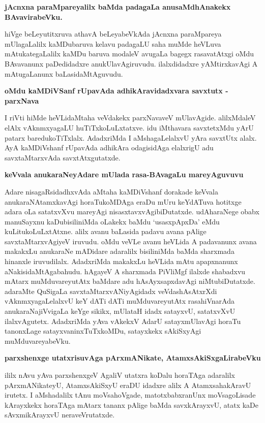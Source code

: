 {\bigskip
\noindent
{\large\bf jAcnxna paraMpareyalilx baMda padagaLa anusaMdhAnakekx BAvavirabeVku.}}\label{page140}
\medskip

\noindent
hiVge beLeyutitxruva athavA beLeyabeVkAda jAcnxna paraMpareya mUlagaLalilx kaMDubaruva kelavu padagaLU saha muMde heVLuva mAtukategaLalilx kaMDu baruva modaleV avugaLa bagegx rasavatAtxgi oMdu BAvavanunx paDedidadxre anukUlavAgiruvudu. ilalxdidadxre yAMtirxkavAgi A mAtugaLanunx baLasidaMtAguvudu.

{\bigskip
\noindent
{\large\bf oMdu kaMDiVSanf rUpavAda adhikAravidadxvara savxtutx - parxNava}}\label{page140a}
\medskip

\noindent
I riVti hiMde heVLidaMtaha veVdakekx parxNavaveV mUlavAgide. alilxMdaleV elAlx vAknmxyagaLU huTiTxkoLuLxtatxve. idu iMthavara savxtetxMdu yArU patarx baredukoTiTxlalx. AdadxriMda I aMshagaLelalxvU yAra savxtUtx alalx. AyA kaMDiVshanf rUpavAda adhikAra odagisidAga elalxrigU adu savxtaMtarxvAda savxtAtxgutatxde.

{\bigskip
\noindent
{\large\bf keVvala anukaraNeyAdare mUlada rasa-BAvagaLu mareyAguvuvu}}\label{page141}
\medskip

\noindent
Adare nisagaRsidadhxvAda aMtaha kaMDiVshanf dorakade keVvala anukaraNAtamxkavAgi horaTukoMDAga eraDu mUru keYdATuva hotitxge adara oLa satatxvXvu mareyAgi nisasxtavxvAgibiDutatxde. udAharaNege obabx manuSayxnu kaDubisiliniMda oLakekx baMdu `usasxpApxDa' eMdu kuLitukoLuLxtAtxne. alilx avanu baLasida padavu avana pAlige savxtaMtarxvAgiyeV iruvudu. oMdu veVLe avanu heVLida A padavanunx avana makakxLu anukaraNe mADidare adaralilx bisiliniMda baMda sharxmada hinanxle iruvudilalx. AdadxriMda makakxLu heVLida mAtu apapxnanunx aNakisidaMtAgabahudu. hAgayeV A sharxmada PiVliMgf ilalxde shabadxvu mAtarx muMduvareyutAtx baMdare adu hAsAyxsapxdavAgi niMtubiDutatxde. adaraMte QuSigaLa savxtaMtarxvANiyAgidadx veVdashAsAtxrXdi vAknmxyagaLelalxvU keY dATi dATi muMduvareyutAtx rasahiVnarAda anukaraNajiVvigaLa keYge sikikx, mUlataH idadx satayxvU, satatxvXvU ilalxvAgutetx. AdadxriMda yAva vAkekxV AdarU satayxmUlavAgi horaTu tanonxLage satayxvaninxTuTxkoMDu, satayxkekx sAkiSxyAgi muMduvareyabeVku.

{\bigskip
\noindent
{\large\bf parxshenxge utatxrisuvAga pArxmANikate, AtamxsAkiSxgaLirabeVku}}\label{page141a}
\medskip

\noindent
ililx nAvu yAva parxshenxgeV AgaliV utatxra koDalu horaTAga adaralilx pArxmANikateyU, AtamxsAkiSxyU eraDU idadxre alilx A AtamxsahakAravU irutetx. I aMshadalilx tAnu moVsahoVgade, matotxbabxranUnx moVsagoLisade kArayxkekx horaTAga mAtarx tananx pAlige baMda savxkArayxvU, atatx kaDe sAvxmikArayxvU neraveVrutatxde.


